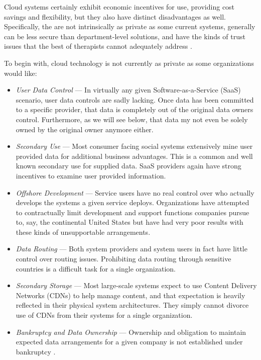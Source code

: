 \documentclass[12pt,letterpaper]{article}
\begin{document}
Cloud systems certainly exhibit economic incentives for use, providing cost savings and flexibility, but they also have distinct disadvantages as well.  Specifically, the are not intrinsically as private as some current systems, generally can be less secure than department-level solutions, and have the kinds of trust issues that the best of therapists cannot adequately address \cite{proposal:privacy-security-trust-cloud}.

To begin with, cloud technology is not currently as private as some organizations would like:
\begin{itemize}
\item \textit{User Data Control} --- In virtually any given Software-as-a-Service (SaaS) scenario, user data controls are sadly lacking.  Once data has been committed to a specific provider, that data is completely out of the original data owners control.  Furthermore, as we will see below, that data my not even be solely owned by the original owner anymore either.
\item \textit{Secondary Use} --- Most consumer facing social systems extensively mine user provided data for additional business advantages.  This is a common and well known secondary use for supplied data.  SaaS providers again have strong incentives to examine user provided information.
\item \textit{Offshore Development} --- Service users have no real control over who actually develops the systems a given service deploys.  Organizations have attempted to contractually limit development and support functions companies pursue to, say, the continental United States but have had very poor results with these kinds of unsupportable arrangements.
\item \textit{Data Routing} --- Both system providers and system users in fact have little control over routing issues.  Prohibiting data routing through sensitive countries is a difficult task for a single organization.
\item \textit{Secondary Storage} --- Most large-scale systems expect to use Content Delivery Networks (CDNs) to help manage content, and that expectation is heavily reflected in their physical system architectures. They simply cannot divorce use of CDNs from their systems for a single organization.
\item \textit{Bankruptcy and Data Ownership} --- Ownership and obligation to maintain expected data arrangements for a given company is not established under bankruptcy \cite{proposal:borders-info-I,proposal:borders-info-II,proposal:borders-info-III}.
\end{itemize}
\end{document}
